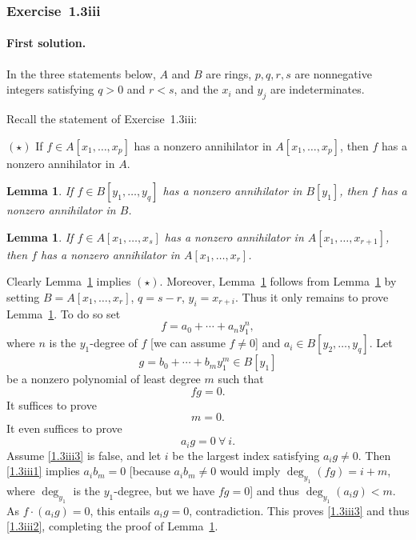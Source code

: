 \documentclass[12pt,letterpaper]{article}%
\newcommand{\nn}{\noindent}
\newtheorem{lem}[thm]{Lemma}
\begin{document}
\subsubsection{Exercise~1.3iii}\label{2sol}

\paragraph{First solution.}

In the three statements below, $A$ and $B$ are rings, $p,q,r,s$ are nonnegative integers satisfying $q>0$ and $r<s$, and the $x_i$ and $y_j$ are indeterminates.

Recall the statement of Exercise~1.3iii: 

\nn$(\star)$ If $f\in A[x_1,\dots,x_p]$ has a nonzero annihilator in $A[x_1,\dots,x_p]$, then $f$ has a nonzero annihilator in $A$. 

\begin{lem}\label{1.3iiil1}
If $f\in B[y_1,\dots,y_q]$ has a nonzero annihilator in $B[y_1]$, then $f$ has a nonzero annihilator in $B$.
\end{lem}

\begin{lem}\label{1.3iiil2}
If $f\in A[x_1,\dots,x_s]$ has a nonzero annihilator in $A[x_1,\dots,x_{r+1}]$, then $f$ has a nonzero annihilator in $A[x_1,\dots,x_r]$.
\end{lem}

Clearly Lemma~\ref{1.3iiil2} implies $(\star)$. Moreover, Lemma~\ref{1.3iiil2} follows from Lemma~\ref{1.3iiil1} by setting $B=A[x_1,\ldots,x_r]$, $q=s-r$, $y_i=x_{r+i}$. Thus it only remains to prove Lemma~\ref{1.3iiil1}. To do so set 
$$
f=a_0+\cdots+a_n y_1^n,
$$ 
where $n$ is the $y_1$-degree of $f$ [we can assume $f\ne0$] and $a_i\in B[y_2,\ldots,y_q]$. Let 
$$
g=b_0+\cdots+b_m y_1^m\in B[y_1]
$$ 
be a nonzero polynomial of least degree $m$ such that 
\begin{equation}\label{1.3iii1}
fg=0.
\end{equation}
It suffices to prove 
\begin{equation}\label{1.3iii2}
m=0.
\end{equation}
It even suffices to prove
\begin{equation}\label{1.3iii3}
a_i g=0\ \forall\ i.
\end{equation}
Assume \eqref{1.3iii3} is false, and let $i$ be the largest index satisfying $a_i g\ne0$. Then \eqref{1.3iii1} implies $a_i b_m=0$ [because $a_i b_m\ne0$ would imply $\deg_{y_1}(fg)=i+m$, where $\deg_{y_1}$ is the $y_1$-degree, but we have $fg=0$] and thus $\deg_{y_1}(a_i g)<m$. As $f\cdot(a_i g)=0$, this entails $a_i g=0$, contradiction. This proves \eqref{1.3iii3} and thus \eqref{1.3iii2}, completing the proof of Lemma~\ref{1.3iiil1}.
\end{document}
